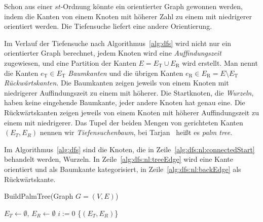 \documentclass[a4paper]{scrreprt}
\theoremstyle{definition}
\begin{document}
Schon aus einer $st$-Ordnung könnte ein orientierter Graph gewonnen werden, indem die Kanten von einem Knoten mit höherer Zahl zu einem mit niedrigerer orientiert werden. Die Tiefensuche liefert eine andere Orientierung.

Im Verlauf der Tiefensuche nach Algorithmus~\ref{alg:dfs} wird nicht nur ein orientierter Graph berechnet, jedem Knoten wird eine \emph{Auffindungszeit} zugewiesen, und eine Partition der Kanten $E = E_\text{T} \cup E_\text{R}$ wird erstellt. Man nennt die Kanten $e_\text{T} \in E_\text{T}$ \emph{Baumkanten} und die übrigen Kanten $e_\text{R} \in E_\text{R} =  E \setminus E_\text{T}$ \emph{Rückwärtskanten}. Die Baumkanten zeigen jeweils von einem Knoten mit niedrigerer Auffindungszeit zu einem mit höherer. Die Startknoten, die \emph{Wurzeln}, haben keine eingehende Baumkante, jeder andere Knoten hat genau eine. Die Rückwärtskanten zeigen jeweils von einem Knoten mit höherer Auffindungszeit zu einem mit niedrigerer. Das Tupel der beiden Mengen von gerichteten Kanten $(E_T, E_R)$ nennen wir \emph{Tiefensuchenbaum}, bei Tarjan~\cite{tarjan-72} heißt es \emph{palm tree}.

Im Algorithmus~\ref{alg:dfs} sind die Knoten, die in Zeile~\ref{alg:dfs:nl:connectedStart} behandelt werden, Wurzeln. In Zeile~\ref{alg:dfs:nl:treeEdge} wird eine Kante orientiert und als Baumkante kategorisiert, in Zeile~\ref{alg:dfs:nl:backEdge} als Rückwärtskante.

\begin{algorithm}[ht]
  \caption{BuildPalmTree(Graph $G = (V,E)$)}
  \label{alg:dfs}
\BlankLine
  $E_T \leftarrow \emptyset$, $E_R \leftarrow \emptyset$ \;
  $i := 0$ \;
\BlankLine
\BlankLine
\BlankLine
    \Return\{$(E_T, E_R)$\}
\end{algorithm}
\end{document}
